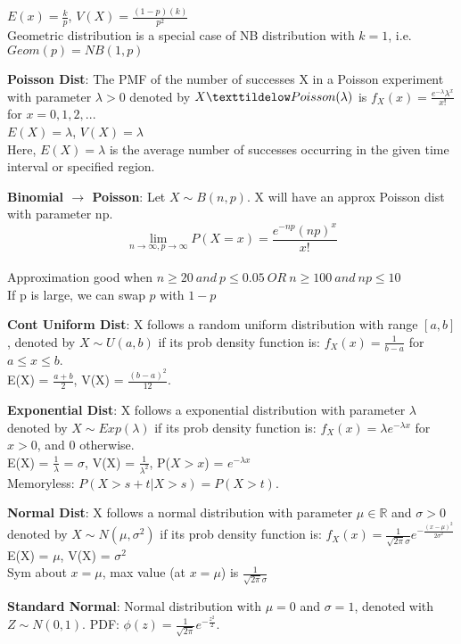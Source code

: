\documentclass[a4paper,landscape]{article}
\newcommand{\rnname}[1]{\textbf{#1}}
\newcommand{\reals}{\mathbb{R}}
\begin{document}
\begin{multicols*}{4}
\begin{flatitemize}
$E(x) = \frac{k}{p}$, $V(X) = \frac{(1-p)(k)}{p^2}$\\
Geometric distribution is a special case of NB distribution with $k = 1$, i.e. $Geom(p) = NB(1, p)$
\item \rnname{Poisson Dist}: The PMF of the number of successes X in a Poisson experiment with parameter $\lambda > 0$ denoted by $X \texttildelow Poisson(\lambda)$ is $f_X(x) = \frac{e^{-\lambda}\lambda^x}{x!}$ for $x = 0, 1, 2, ...$\\
$E(X) = \lambda$, $V(X) = \lambda$ \\
Here, $E(X) = \lambda$ is the average number of successes occurring in the given
time interval or specified region.
\item \rnname{Binomial $\rightarrow$ Poisson}: Let $X \sim B(n,p)$. X will have an approx Poisson dist with parameter np. \\
$$\displaystyle \lim_{n\rightarrow\infty, p\rightarrow\infty}P(X = x) = \frac{e^{-np}(np)^x}{x!}$$\\
Approximation good when $n \geq 20\ and\ p \leq 0.05\ OR\ n \geq 100\ and\ np \leq 10$\\
If p is large, we can swap $p$ with $1-p$
\item \rnname{Cont Uniform Dist}: X follows a random uniform distribution with range $[a, b]$, denoted by $X \sim U(a,b)$ if its prob density function is:
$f_X(x) = \frac{1}{b-a}$ for $a \leq x \leq b$. \\
E(X) = $\frac{a+b}{2}$, V(X) = $\frac{(b-a)^2}{12}$.
\item \rnname{Exponential Dist}: X follows a exponential distribution with parameter $\lambda$ denoted by $X \sim Exp(\lambda)$ if its prob density function is:
$f_X(x) = \lambda e^{-\lambda x}$ for $x > 0$, and $0$ otherwise. \\
E(X) = $\frac{1}{\lambda}$ = $\sigma$, V(X) = $\frac{1}{\lambda^2}$, P($X>x$) = $e^{-\lambda x}$ \\
Memoryless: $P(X > s + t | X > s) = P(X > t)$.
\item \rnname{Normal Dist}: X follows a normal distribution with parameter $\mu \in \reals$ and $\sigma > 0$ denoted by $X \sim N(\mu, \sigma^2)$ if its prob density function is:
$f_X(x) = \frac{1}{\sqrt{2\pi}\sigma}e^{-\frac{(x-\mu)^2}{2\sigma^2}}$ \\
E(X) = $\mu$, 
V(X) = $\sigma^2$\\
Sym about $x = \mu$, max value (at $x = \mu$) is $\frac{1}{\sqrt{2 \pi} \sigma}$
\item \rnname{Standard Normal}: Normal distribution with $\mu = 0$ and $\sigma = 1$, denoted with $Z \sim N(0, 1)$. PDF: $\phi(z) = \frac{1}{\sqrt{2\pi}}e^{-\frac{z^2}{2}}$. \\

\end{flatitemize}
\end{multicols*}
\end{document}
